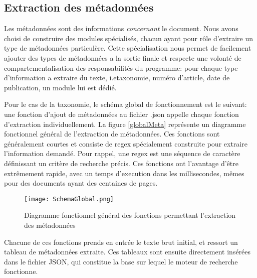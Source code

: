 \subsection{Extraction des métadonnées}
Les métadonnées sont des informations \textit{concernant} le document. Nous avons choisi de construire des modules spécialisés, chacun ayant pour rôle d'extraire un type de métadonnées particulère. Cette spécialisation nous permet de facilement ajouter des types de métadonnées a la sortie finale et respecte une volonté de compartementalisation des responsabilités du programme: pour chaque type d'information a extraire du texte, i.e\. taxonomie, numéro d'article, date de publication, un module lui est dédié. 

Pour le cas de la taxonomie, le schéma global de fonctionnement est le suivant: une fonction d'ajout de métadonnées au fichier .json appelle chaque fonction d'extraction individuellement. La figure \ref{globalMeta} représente un diagramme fonctionnel général de l'extraction de métadonnées. Ces fonctions sont généralement courtes et consiste de regex spécialement construite pour extraire l'information demandé. Pour rappel, une regex est une séquence de caractère définissant un critère de recherche précis. Ces fonctions ont l'avantage d'être extrêmement rapide, avec un temps d'execution dans les millisecondes, mêmes pour des documents ayant des centaines de pages. 

\begin{figure}[h!]
  \centering
	\texttt{[image: SchemaGlobal.png]}
	\caption[]{Diagramme fonctionnel général des fonctions permettant l'extraction des métadonnées}
  \label{fig:globalMeta}
\end{figure}

Chacune de ces fonctions prends en entrée le texte brut initial, et ressort un tableau de métadonnées extraite. Ces tableaux sont ensuite directement insérées dans le fichier JSON, qui constitue la base sur lequel le moteur de recherche fonctionne.
